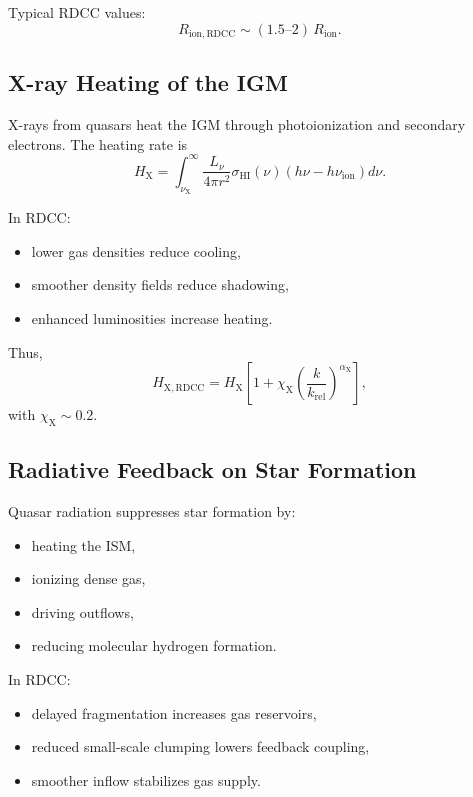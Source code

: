 \documentclass[11pt,a4paper]{article}
\begin{document}
Typical RDCC values:
\begin{equation}
R_{\mathrm{ion,RDCC}}
\sim
(1.5\text{--}2)\,R_{\mathrm{ion}}.
\end{equation}

\subsection{X-ray Heating of the IGM}

X-rays from quasars heat the IGM through photoionization and secondary electrons. The
heating rate is
\begin{equation}
H_{\mathrm{X}}
=
\int_{\nu_{\mathrm{X}}}^{\infty}
\frac{L_{\nu}}{4\pi r^{2}}
\sigma_{\mathrm{HI}}(\nu)
\left(h\nu - h\nu_{\mathrm{ion}}\right)
d\nu.
\end{equation}

In RDCC:
\begin{itemize}
\item lower gas densities reduce cooling,
\item smoother density fields reduce shadowing,
\item enhanced luminosities increase heating.
\end{itemize}

Thus,
\begin{equation}
H_{\mathrm{X,RDCC}}
=
H_{\mathrm{X}}
\left[
1
+
\chi_{\mathrm{X}}
\left(
\frac{k}{k_{\mathrm{rel}}}
\right)^{\alpha_{\mathrm{X}}}
\right],
\end{equation}
with $\chi_{\mathrm{X}} \sim 0.2$.

\subsection{Radiative Feedback on Star Formation}

Quasar radiation suppresses star formation by:
\begin{itemize}
\item heating the ISM,
\item ionizing dense gas,
\item driving outflows,
\item reducing molecular hydrogen formation.
\end{itemize}

In RDCC:
\begin{itemize}
\item delayed fragmentation increases gas reservoirs,
\item reduced small-scale clumping lowers feedback coupling,
\item smoother inflow stabilizes gas supply.
\end{itemize}
\end{document}

